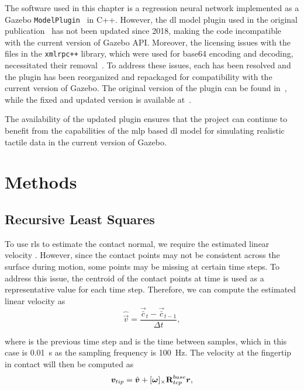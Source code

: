 The software used in this chapter is a regression neural network implemented as a Gazebo \texttt{ModelPlugin}~\cite{gazebo-model-plugin} in C++. However, the \gls{dl} model plugin used in the original publication~\cite{simulation-of-the-syntouch-biotac-sensor} has not been updated since \num{2018}, making the code incompatible with the current version of Gazebo API. Moreover, the licensing issues with the files in the \texttt{xmlrpc++} library, which were used for base64 encoding and decoding, necessitated their removal~\cite{base64-encoding-decoding-licensing-issue}. To address these issues, each has been resolved and the plugin has been reorganized and repackaged for compatibility with the current version of Gazebo. The original version of the plugin can be found in~\cite{ruppel-philipp-biotac-gazebo-plugin}, while the fixed and updated version is available at~\cite{melbye-staven-biotac-sim-plugin}. \medskip

The availability of the updated plugin ensures that the project can continue to benefit from the capabilities of the \gls{mlp} based \gls{dl} model for simulating realistic tactile data in the current version of Gazebo.

\section{Methods}\label{sec:1-tactile-perception-method}

\subsection{Recursive Least Squares}\label{sec:1-tactile-perception-recirsive-least-squares}

To use \gls{rls} to estimate the contact normal, we require the estimated linear velocity . However, since the contact points may not be consistent across the surface during motion, some points may be missing at certain time steps. To address this issue, the centroid of the contact points  at time  is used as a representative value for each time step. Therefore, we can compute the estimated linear velocity as 
%
\begin{equation} \label{eq:v-estimate}
	\hat{\vec{v}} = \frac{\vec{\bar{c}}_{t} - \vec{\bar{c}}_{t-1}}{\Delta t},
\end{equation}

where  is the previous time step and  is the time between samples, which in this case is \SI{0.01}{s} as the sampling frequency is \SI{100}{\hertz}. \medskip
The velocity at the fingertip in contact will then be computed as
%
\begin{equation} \label{eq:v-tip-def}
	\vec{v}_{tip} = \hat{\vec{v}} + [\bm{\omega}]_\times \rot[R]{base}{tcp} \vec{r},
\end{equation}

